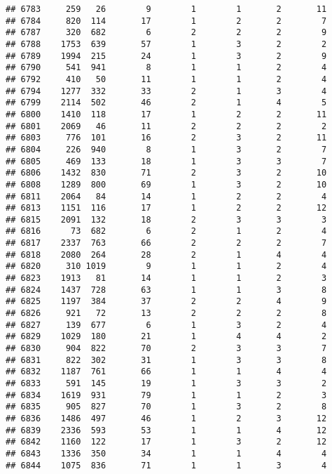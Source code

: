 \documentclass[]{article}
\begin{document}
\begin{verbatim}
## 6783     259   26        9        1        1       2       11
## 6784     820  114       17        1        2       2        7
## 6787     320  682        6        2        2       2        9
## 6788    1753  639       57        1        3       2        2
## 6789    1994  215       24        1        3       2        9
## 6790     541  941        8        1        1       2        4
## 6792     410   50       11        1        1       2        4
## 6794    1277  332       33        2        1       3        4
## 6799    2114  502       46        2        1       4        5
## 6800    1410  118       17        1        2       2       11
## 6801    2069   46       11        2        2       2        2
## 6803     776  101       16        2        3       2       11
## 6804     226  940        8        1        3       2        7
## 6805     469  133       18        1        3       3        7
## 6806    1432  830       71        2        3       2       10
## 6808    1289  800       69        1        3       2       10
## 6811    2064   84       14        1        2       2        4
## 6813    1151  116       17        1        2       2       12
## 6815    2091  132       18        2        3       3        3
## 6816      73  682        6        2        1       2        4
## 6817    2337  763       66        2        2       2        7
## 6818    2080  264       28        2        1       4        4
## 6820     310 1019        9        1        1       2        4
## 6823    1913   81       14        1        1       2        3
## 6824    1437  728       63        1        1       3        8
## 6825    1197  384       37        2        2       4        9
## 6826     921   72       13        2        2       2        8
## 6827     139  677        6        1        3       2        4
## 6829    1029  180       21        1        4       4        2
## 6830     904  822       70        2        3       3        7
## 6831     822  302       31        1        3       3        8
## 6832    1187  761       66        1        1       4        4
## 6833     591  145       19        1        3       3        2
## 6834    1619  931       79        1        1       2        3
## 6835     905  827       70        1        3       2        8
## 6836    1486  497       46        1        2       3       12
## 6839    2336  593       53        1        1       4       12
## 6842    1160  122       17        1        3       2       12
## 6843    1336  350       34        1        1       4        4
## 6844    1075  836       71        1        1       3        4

\end{verbatim}
\end{document}
